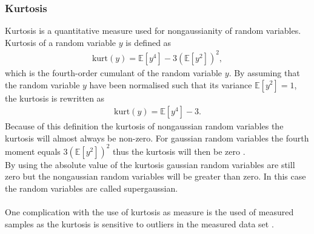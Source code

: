 \subsubsection{Kurtosis}
Kurtosis is a quantitative measure used for nongaussianity of random variables. Kurtosis of a random variable $y$ is defined as
\begin{align*}
\text{kurt} (y) = \mathbb{E}[y^4] - 3 ( \mathbb{E}[y^2])^2,
\end{align*}
which is the fourth-order cumulant of the random variable $y$. By assuming that the random variable $y$ have been normalised such that its variance $\mathbb{E}[y^2] = 1$, the kurtosis is rewritten as
\begin{align*}
\text{kurt} (y) = \mathbb{E}[y^4] - 3.
\end{align*}
Because of this definition the kurtosis of nongaussian random variables the kurtosis will almost always be non-zero. For gaussian random variables the fourth moment equals $3(\mathbb{E}[y^2])^2$ thus the kurtosis will then be zero \cite[p. 171]{ICA}.
\\
By using the absolute value of the kurtosis gaussian random variables are still zero but the nongaussian random variables will be greater than zero. In this case the random variables are called supergaussian.
\\ \\
One complication with the use of kurtosis as measure is the used of measured samples as the kurtosis is sensitive to outliers in the measured data set \cite[p. 182]{ICA}. 
